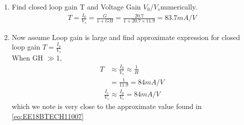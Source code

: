 \begin{enumerate}[label=\thesection.\arabic*.,ref=\thesection.\theenumi]
%		
\item Find closed loop gain T and Voltage Gain $V_0/V_s$numerically.
\\ 
\solution
 \begin{align}
 \label{eq:EE18BTECH11007}
    T=\frac{I_0}{V_s}=\frac{G}{1+GH}=\frac{20.7}{1+20.7\times11.9}=83.7mA/V
\end{align}
\item Now assume Loop gain is large and find approximate expression for closed loop gain $T=\frac{I_o}{V_s}$
\\
\solution When GH $\gg$1,
\begin{align}
    T &\approx\frac{I_0}{V_s}\approx \frac{1}{H}
\\
    &=\frac{1}{11.9}=84mA/V
\end{align}
\begin{align}
 \frac{I_c}{V_s}\approx\frac{I_0}{V_s}=84 mA/V
 \end{align}
 which  we note is very close to the approximate value found in \eqref{eq:EE18BTECH11007} 

\end{enumerate}

